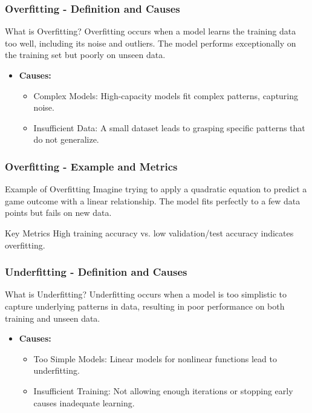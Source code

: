 \documentclass[aspectratio=169]{beamer}
\begin{document}
\begin{frame}[fragile]
    \frametitle{Overfitting - Definition and Causes}
    \begin{block}{What is Overfitting?}
        Overfitting occurs when a model learns the training data too well, including its noise and outliers. 
        The model performs exceptionally on the training set but poorly on unseen data.
    \end{block}

    \begin{itemize}
        \item \textbf{Causes:}
        \begin{itemize}
            \item Complex Models: High-capacity models fit complex patterns, capturing noise.
            \item Insufficient Data: A small dataset leads to grasping specific patterns that do not generalize.
        \end{itemize}
    \end{itemize}
\end{frame}

\begin{frame}[fragile]
    \frametitle{Overfitting - Example and Metrics}
    \begin{block}{Example of Overfitting}
        Imagine trying to apply a quadratic equation to predict a game outcome with a linear relationship. 
        The model fits perfectly to a few data points but fails on new data.
    \end{block}

    \begin{block}{Key Metrics}
        High training accuracy vs. low validation/test accuracy indicates overfitting.
    \end{block}
\end{frame}

\begin{frame}[fragile]
    \frametitle{Underfitting - Definition and Causes}
    \begin{block}{What is Underfitting?}
        Underfitting occurs when a model is too simplistic to capture underlying patterns in data, resulting in poor performance on both training and unseen data.
    \end{block}

    \begin{itemize}
        \item \textbf{Causes:}
        \begin{itemize}
            \item Too Simple Models: Linear models for nonlinear functions lead to underfitting.
            \item Insufficient Training: Not allowing enough iterations or stopping early causes inadequate learning.
        \end{itemize}
    \end{itemize}
\end{frame}
\end{document}
